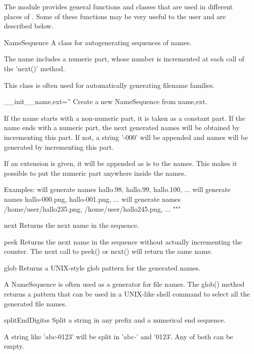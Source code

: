 The  module provides general functions and classes that are used in different places of \pyformex. Some of these functions may be very useful to the user and are described below.

\begin{classdesc}{NameSequence}{}
A class for autogenerating sequences of names.

The name includes a numeric part, whose number is incremented
at each call of the 'next()' method.

This class is often used for automatically generating filename families.
    
\begin{memberdesc}{__init__}{name,ext=''}
Create a new NameSequence from name,ext.

If the name starts with a non-numeric part, it is taken as a constant part.
If the name ends with a numeric part, the next generated names will
be obtained by incrementing this part.
If not, a string '-000' will be appended and names will be generated
by incrementing this part.

If an extension is given, it will be appended as is to the names.
This makes it possible to put the numeric part anywhere inside the
names.

Examples:
 will generate names hallo.98, hallo.99, hallo.100, ...
 will generate names hallo-000.png, hallo-001.png, ...
 will generate names
/home/user/hallo235.png, /home/user/hallo245.png, ...
"""
\end{memberdesc}

\begin{memberdesc}{next}
Returns the next name in the sequence.
\end{memberdesc}

\begin{memberdesc}{peek}
Returns the next name in the sequence without actually incrementing the counter.
The next call to peek() or next() will return the same name.
\end{memberdesc}

\begin{memberdesc}{glob}
Returns a UNIX-style glob pattern for the generated names.

A NameSequence is often used as a generator for file names.
The glob() method returns a pattern that can be used in a
UNIX-like shell command to select all the generated file names.
\end{memberdesc}
\end{classdesc}


\begin{funcdesc}{splitEndDigits}{s}
    Split a string in any prefix and a numerical end sequence.

    A string like 'abc-0123' will be split in 'abc-' and '0123'.
    Any of both can be empty.
\end{funcdesc} 




